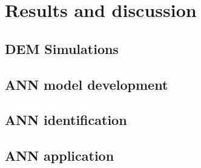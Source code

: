 
\section{Results and discussion}
\label{sec:results}

\lipsum[1]


\subsection{DEM Simulations}
\label{subsec:simulations}
\lipsum[1]





\subsection{ANN model development}
\label{subsec:annmodeldev}
\lipsum[1]


\subsection{ANN identification}
\label{subsec:annmodeliden}
\lipsum[1]


\subsection{ANN application}
\label{subsec:annapplication}
\lipsum[1]






